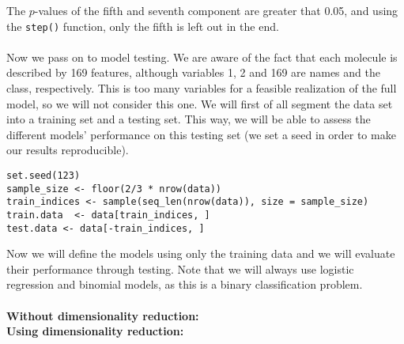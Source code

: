 \documentclass[10pt]{article}
\begin{document}
The $p$-values of the fifth and seventh component are greater that 0.05, and using the \verb|step()| function, only the fifth is left out in the end.
\\ \ \\
Now we pass on to model testing. We are aware of the fact that each molecule is described by 169 features, although variables 1, 2 and 169 are names and the class, respectively. This is too many variables for a feasible realization of the full model, so we will not consider this one. We will first of all segment the data set into a training set and a testing set. This way, we will be able to assess the different models' performance on this testing set (we set a seed in order to make our results reproducible).
\begin{verbatim}
set.seed(123)
sample_size <- floor(2/3 * nrow(data))
train_indices <- sample(seq_len(nrow(data)), size = sample_size)
train.data  <- data[train_indices, ]
test.data <- data[-train_indices, ]
\end{verbatim}
Now we will define the models using only the training data and we will evaluate their performance through testing. Note that we will always use logistic regression and binomial models, as this is a binary classification problem.
\\ \ \\
\Large{\textbf{Without dimensionality reduction:}}\\

\Large{\textbf{Using dimensionality reduction:}}
\end{document}
